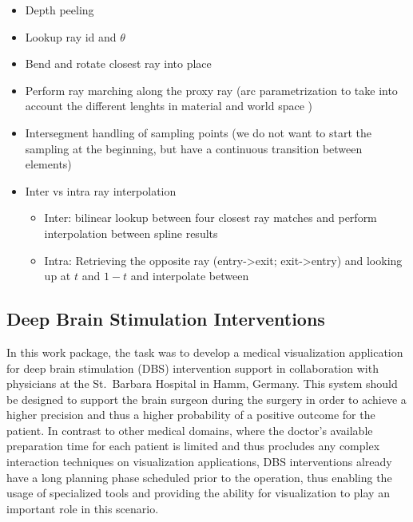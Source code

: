 \begin{itemize}
\begin{itemize}
    \item Depth peeling \cite{mammen89DepthPeeling}
    \item Lookup ray id and $\theta$
    \item Bend and rotate closest ray into place
    \item Perform ray marching along the proxy ray (arc parametrization to take into account the different lenghts in material and world space \cite{guenter90arclength})
    \item Intersegment handling of sampling points (we do not want to start the sampling at the beginning, but have a continuous transition between elements)
    \item Inter vs intra ray interpolation
    \begin{itemize}
        \item Inter: bilinear lookup between four closest ray matches and perform interpolation between spline results
        \item Intra: Retrieving the opposite ray (entry->exit; exit->entry) and looking up at $t$ and $1-t$ and interpolate between
    \end{itemize}
\end{itemize}

\end{itemize}

\subsection{Deep Brain Stimulation Interventions}
\label{contributions:medbio:dbs}
In this work package, the task was to develop a medical visualization application for deep brain stimulation (DBS) intervention support in collaboration with physicians at the St.~Barbara Hospital in Hamm, Germany. This system should be designed to support the brain surgeon during the surgery in order to achieve a higher precision and thus a higher probability of a positive outcome for the patient. In contrast to other medical domains, where the doctor's available preparation time for each patient is limited and thus procludes any complex interaction techniques on visualization applications, DBS interventions already have a long planning phase scheduled prior to the operation, thus enabling the usage of specialized tools and providing the ability for visualization to play an important role in this scenario.

